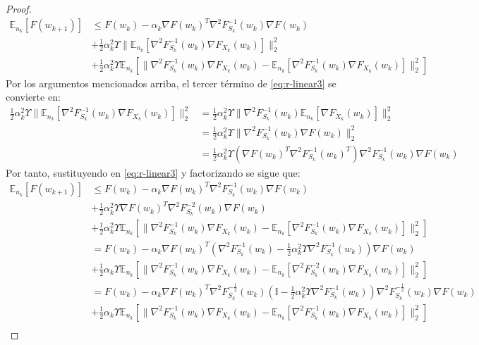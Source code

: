 \documentclass{book}
\theoremstyle{plain}
\theoremstyle{definition}
\theoremstyle{remark}
\begin{document}
\begin{proof}
\begin{equation}
\begin{split}
     \mathbb{E}_{n_k}[F(w_{k+1})] & \leq F(w_{k}) -\alpha_k\nabla F(w_{k})^T\nabla^2F_{S_k}^{-1}(w_k)\nabla F(w_k)\\ & +\frac{1}{2}\alpha^2_k\Upsilon\|\mathbb{E}_{n_k}[\nabla^2F_{S_k}^{-1}(w_k)\nabla F_{X_k}(w_k)]\|_2^2 \\ & + \frac{1}{2}\alpha^2_k\Upsilon\mathbb{E}_{n_k}[\|\nabla^2F_{S_k}^{-1}(w_k)\nabla F_{X_k}(w_k) - \mathbb{E}_{n_k}[\nabla^2F_{S_k}^{-1}(w_k)\nabla F_{X_k}(w_k)]\|_2^2]
\end{split}
\end{equation}
Por los argumentos mencionados arriba, el tercer término de \ref{eq:r-linear3} se convierte en: 
\begin{equation*}
\begin{split}
 \frac{1}{2}\alpha^2_k\Upsilon\|\mathbb{E}_{n_k}[\nabla^2F_{S_k}^{-1}(w_k)\nabla F_{X_k}(w_k)]\|_2^2 & = \frac{1}{2}\alpha^2_k\Upsilon\|\nabla^2F_{S_k}^{-1}(w_k)\mathbb{E}_{n_k}[\nabla F_{X_k}(w_k)]\|_2^2 \\
 & = \frac{1}{2}\alpha^2_k\Upsilon\|\nabla^2F_{S_k}^{-1}(w_k)\nabla F(w_k)\|_2^2 \\
 & = \frac{1}{2}\alpha^2_k\Upsilon(\nabla F(w_k)^T\nabla^2F_{S_k}^{-1}(w_k)^T)\nabla^2F_{S_k}^{-1}(w_k)\nabla F(w_k)
\end{split}
\end{equation*}
Por tanto, sustituyendo en \ref{eq:r-linear3} y factorizando se sigue que:
\begin{equation}\label{eq:r-linear4}
\begin{split}
    \mathbb{E}_{n_k}[F(w_{k+1})] &  \leq F(w_{k}) -\alpha_k\nabla F(w_{k})^T\nabla^2F_{S_k}^{-1}(w_k)\nabla F(w_k)\\ & +\frac{1}{2}\alpha^2_k\Upsilon\nabla F(w_k)^T\nabla^2F_{S_k}^{-2}(w_k)\nabla F(w_k) \\ & + \frac{1}{2}\alpha^2_k\Upsilon\mathbb{E}_{n_k}[\|\nabla^2F_{S_k}^{-1}(w_k)\nabla F_{X_k}(w_k) - \mathbb{E}_{n_k}[\nabla^2F_{S_k}^{-1}(w_k)\nabla F_{X_k}(w_k)]\|_2^2] \\
    & =F(w_{k}) -\alpha_k\nabla F(w_{k})^T(\nabla^2F_{S_k}^{-1}(w_k)-\frac{1}{2}\alpha^2_k\Upsilon\nabla^2F_{S_k}^{-1}(w_k))\nabla F(w_k)\\ & + \frac{1}{2}\alpha_k\Upsilon\mathbb{E}_{n_k}[\|\nabla^2F_{S_k}^{-1}(w_k)\nabla F_{X_k}(w_k) - \mathbb{E}_{n_k}[\nabla^2F_{S_k}^{-2}(w_k)\nabla F_{X_k}(w_k)]\|_2^2]\\
     & =F(w_{k}) -\alpha_k\nabla F(w_{k})^T\nabla^2F_{S_k}^{-\frac{1}{2}}(w_k)(\mathbb{I}-\frac{1}{2}\alpha^2_k\Upsilon\nabla^2F_{S_k}^{-1}(w_k))\nabla^2F_{S_k}^{-\frac{1}{2}}(w_k)\nabla F(w_k)\\ & + \frac{1}{2}\alpha_k\Upsilon\mathbb{E}_{n_k}[\|\nabla^2F_{S_k}^{-1}(w_k)\nabla F_{X_k}(w_k) - \mathbb{E}_{n_k}[\nabla^2F_{S_k}^{-1}(w_k)\nabla F_{X_k}(w_k)]\|_2^2]\\

\end{split}
\end{equation}
\end{proof}
\end{document}
